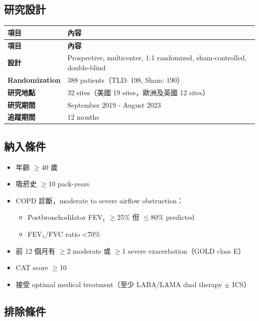 \documentclass[12pt,a4paper]{article}
\begin{document}
\subsection{研究設計}

\begin{longtable}{p{4cm}p{10cm}}
\toprule
\textbf{項目} & \textbf{內容} \\
\midrule
\endfirsthead

\toprule
\textbf{項目} & \textbf{內容} \\
\midrule
\endhead

\bottomrule
\endfoot

\textbf{設計} & Prospective, multicenter, 1:1 randomized, sham-controlled, double-blind \\
\midrule
\textbf{Randomization} & 388 patients（TLD: 198, Sham: 190）\\
\midrule
\textbf{研究地點} & 32 sites（美國 19 sites，歐洲及英國 12 sites）\\
\midrule
\textbf{研究期間} & September 2019 - August 2023 \\
\midrule
\textbf{追蹤期間} & 12 months \\
\bottomrule
\end{longtable}

\subsection{納入條件}

\begin{itemize}
    \item 年齡 $\geq$40 歲
    \item 吸菸史 $\geq$10 pack-years
    \item COPD 診斷，moderate to severe airflow obstruction：
    \begin{itemize}
        \item Postbronchodilator FEV$_1$ $\geq$25\% 但 $\leq$80\% predicted
        \item FEV$_1$/FVC ratio <70\%
    \end{itemize}
    \item 前 12 個月有 $\geq$2 moderate 或 $\geq$1 severe exacerbation（GOLD class E）
    \item CAT score $\geq$10
    \item 接受 optimal medical treatment（至少 LABA/LAMA dual therapy $\pm$ ICS）
\end{itemize}

\subsection{排除條件}
\end{document}

